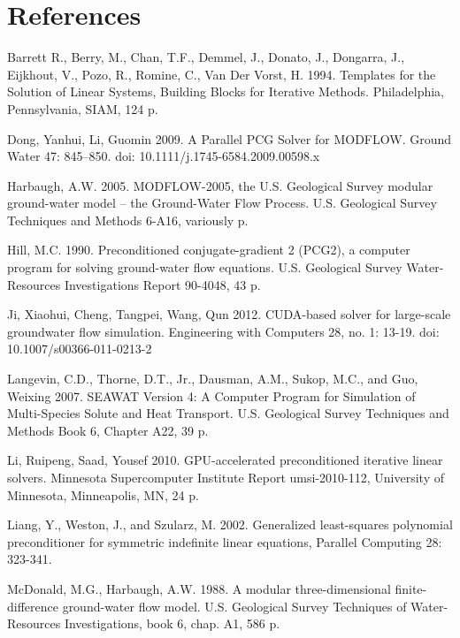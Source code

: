\documentclass[12pt]{article}
\begin{document}
\section*{\bf References}
\begin{description}

\item Barrett R., Berry, M.,  Chan, T.F., Demmel, J., Donato, J., Dongarra, J., Eijkhout, V.,  Pozo, R., Romine, C., Van Der Vorst, H. 1994. Templates for the Solution of Linear Systems, Building Blocks for Iterative Methods. Philadelphia, Pennsylvania, SIAM, 124 p.

\item Dong, Yanhui, Li, Guomin 2009. A Parallel PCG Solver for MODFLOW. Ground Water 47: 845–850. doi: 10.1111/j.1745-6584.2009.00598.x

\item Harbaugh, A.W. 2005. MODFLOW-2005, the U.S. Geological Survey modular ground-water model -- the Ground-Water Flow Process. U.S. Geological Survey Techniques and Methods 6-A16, variously p.

\item Hill, M.C. 1990. Preconditioned conjugate-gradient 2 (PCG2), a computer program for solving ground-water flow equations. U.S. Geological Survey Water-Resources Investigations Report 90-4048, 43 p.

\item Ji, Xiaohui, Cheng, Tangpei, Wang, Qun 2012. CUDA-based solver for large-scale groundwater flow simulation. Engineering with Computers 28, no. 1: 13-19. doi: 10.1007/s00366-011-0213-2

\item Langevin, C.D., Thorne, D.T., Jr., Dausman, A.M., Sukop, M.C., and Guo, Weixing 2007. SEAWAT Version 4: A Computer Program for Simulation of Multi-Species Solute and Heat Transport. U.S. Geological Survey Techniques and Methods Book 6, Chapter A22, 39 p.

\item Li, Ruipeng, Saad, Yousef 2010. GPU-accelerated preconditioned iterative linear solvers. Minnesota Supercomputer Institute Report umsi-2010-112, University of Minnesota, Minneapolis, MN, 24 p.

\item Liang, Y., Weston, J., and Szularz, M. 2002. Generalized least-squares polynomial preconditioner for symmetric indefinite linear equations, Parallel Computing 28: 323-341.

\item McDonald, M.G., Harbaugh, A.W. 1988. A modular three-dimensional finite-difference ground-water flow model. U.S. Geological Survey Techniques of Water-Resources Investigations, book 6, chap. A1, 586 p.


\end{description}
\end{document}
